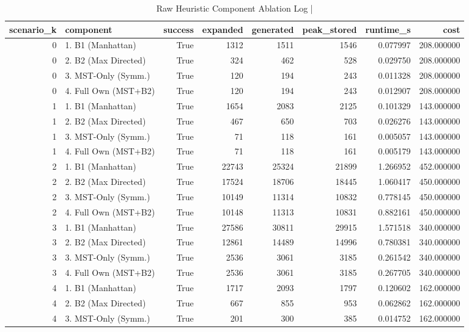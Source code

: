 \begin{table}[htbp]
\centering
\caption{Raw Heuristic Component Ablation Log | \stampline}
\label{tab:ablation_raw}
\begin{tabular}{rlrrrrrr}
\toprule
scenario\_k & component & success & expanded & generated & peak\_stored & runtime\_s & cost \\
\midrule
0 & 1. B1 (Manhattan) & True & 1312 & 1511 & 1546 & 0.077997 & 208.000000 \\
0 & 2. B2 (Max Directed) & True & 324 & 462 & 528 & 0.029750 & 208.000000 \\
0 & 3. MST-Only (Symm.) & True & 120 & 194 & 243 & 0.011328 & 208.000000 \\
0 & 4. Full Own (MST+B2) & True & 120 & 194 & 243 & 0.012907 & 208.000000 \\
1 & 1. B1 (Manhattan) & True & 1654 & 2083 & 2125 & 0.101329 & 143.000000 \\
1 & 2. B2 (Max Directed) & True & 467 & 650 & 703 & 0.026276 & 143.000000 \\
1 & 3. MST-Only (Symm.) & True & 71 & 118 & 161 & 0.005057 & 143.000000 \\
1 & 4. Full Own (MST+B2) & True & 71 & 118 & 161 & 0.005179 & 143.000000 \\
2 & 1. B1 (Manhattan) & True & 22743 & 25324 & 21899 & 1.266952 & 452.000000 \\
2 & 2. B2 (Max Directed) & True & 17524 & 18706 & 18445 & 1.060417 & 450.000000 \\
2 & 3. MST-Only (Symm.) & True & 10149 & 11314 & 10832 & 0.778145 & 450.000000 \\
2 & 4. Full Own (MST+B2) & True & 10148 & 11313 & 10831 & 0.882161 & 450.000000 \\
3 & 1. B1 (Manhattan) & True & 27586 & 30811 & 29915 & 1.571518 & 340.000000 \\
3 & 2. B2 (Max Directed) & True & 12861 & 14489 & 14996 & 0.780381 & 340.000000 \\
3 & 3. MST-Only (Symm.) & True & 2536 & 3061 & 3185 & 0.261542 & 340.000000 \\
3 & 4. Full Own (MST+B2) & True & 2536 & 3061 & 3185 & 0.267705 & 340.000000 \\
4 & 1. B1 (Manhattan) & True & 1717 & 2093 & 1797 & 0.120602 & 162.000000 \\
4 & 2. B2 (Max Directed) & True & 667 & 855 & 953 & 0.062862 & 162.000000 \\
4 & 3. MST-Only (Symm.) & True & 201 & 300 & 385 & 0.014752 & 162.000000 \\

\end{tabular}
\end{table}
